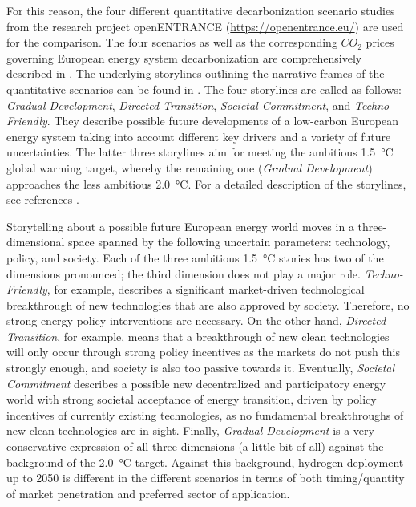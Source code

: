 \documentclass[review]{elsarticle}
\begin{document}
For this reason, the four different quantitative decarbonization scenario studies from the research project {openENTRANCE} (\url{https://openentrance.eu/}) are used for the comparison. The four scenarios as well as the corresponding $CO_2$ prices governing European energy system decarbonization are comprehensively described in \cite{auer2020development, auer2020quantitative}. The underlying storylines outlining the narrative frames of the quantitative scenarios can be found in \cite{auer2019quantitative}. The four storylines are called as follows: \textit{Gradual Development}, \textit{Directed Transition}, \textit{Societal Commitment}, and \textit{Techno-Friendly}. They describe possible future developments of a low-carbon European energy system taking into account different key drivers and a variety of future uncertainties. The latter three storylines aim for meeting the ambitious \SI{1.5}{\degreeCelsius} global warming target, whereby the remaining one (\textit{Gradual Development}) approaches the less ambitious \SI{2.0}{\degreeCelsius}. For a detailed description of the storylines, see references \cite{auer2020development, auer2020quantitative}.\vspace{0.3cm}

Storytelling about a possible future European energy world moves in a three-dimensional space spanned by the following uncertain parameters: technology, policy, and society. Each of the three ambitious \SI{1.5}{\degreeCelsius} stories has two of the dimensions pronounced; the third dimension does not play a major role. \textit{Techno-Friendly}, for example, describes a significant market-driven technological breakthrough of new technologies that are also approved by society. Therefore, no strong energy policy interventions are necessary. On the other hand, \textit{Directed Transition}, for example, means that a breakthrough of new clean technologies will only occur through strong policy incentives as the markets do not push this strongly enough, and society is also too passive towards it. Eventually, \textit{Societal Commitment} describes a possible new decentralized and participatory energy world with strong societal acceptance of energy transition, driven by policy incentives of currently existing technologies, as no fundamental breakthroughs of new clean technologies are in sight. Finally, \textit{Gradual Development} is a very conservative expression of all three dimensions (a little bit of all) against the background of the \SI{2.0}{\degreeCelsius} target. Against this background, hydrogen deployment up to 2050 is different in the different scenarios in terms of both timing/quantity of market penetration and preferred sector of application.\vspace{0.3cm}
\end{document}
